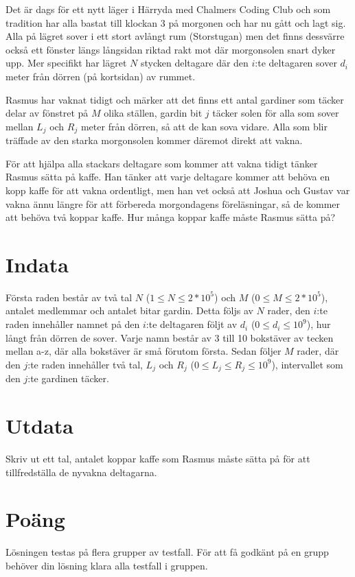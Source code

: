 
Det är dags för ett nytt läger i Härryda med Chalmers Coding Club och som tradition har alla bastat till klockan 3 på
morgonen och har nu gått och lagt sig. Alla på lägret sover i ett stort avlångt rum (Storstugan) men det finns dessvärre
också ett fönster längs långsidan riktad rakt mot där morgonsolen snart dyker upp. Mer specifikt har lägret $N$ stycken
deltagare där den $i$:te deltagaren sover $d_i$ meter från dörren (på kortsidan) av rummet.


Rasmus har vaknat tidigt och märker att det finns ett antal gardiner som täcker delar av fönstret på $M$ olika ställen,
gardin bit $j$ täcker solen för alla som sover mellan $L_j$ och $R_j$ meter från dörren, så att de kan sova vidare. Alla
som blir träffade av den starka morgonsolen kommer däremot direkt att vakna.

För att hjälpa alla stackars deltagare som kommer att vakna tidigt tänker Rasmus sätta på kaffe. Han tänker att varje
deltagare kommer att behöva en kopp kaffe för att vakna ordentligt, men han vet också att Joshua och Gustav
var vakna ännu längre för att förbereda morgondagens föreläsningar, så de kommer att behöva två koppar kaffe. Hur
många koppar kaffe måste Rasmus sätta på?


\section*{Indata}
Första raden består av två tal $N$ ($1 \le N \le 2 * 10^5$) och $M$ ($0 \le M \le 2 * 10^5$), antalet medlemmar och antalet bitar gardin. Detta följs
av $N$ rader, den $i$:te raden innehåller namnet på den $i$:te deltagaren följt av $d_i$ ($0 \le d_i \le 10^9$), hur långt
från dörren de sover. Varje namn består av 3 till 10 bokstäver av tecken mellan a-z, där alla bokstäver är små förutom första.
Sedan följer $M$ rader, där den $j$:te raden innehåller två tal, $L_j$ och $R_j$ ($0 \le L_j \le R_j \le 10^9$),
intervallet som den $j$:te gardinen täcker.

\section*{Utdata}
Skriv ut ett tal, antalet koppar kaffe som Rasmus måste sätta på för att tillfredställa de nyvakna deltagarna.

\section*{Poäng}
Lösningen testas på flera grupper av testfall. För att få godkänt på en grupp behöver din lösning
klara alla testfall i gruppen.

